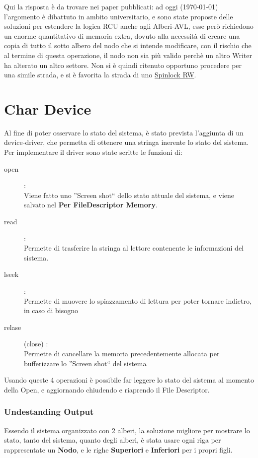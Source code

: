 Qui la risposta è da trovare nei paper pubblicati: ad oggi (\today) l'argomento è dibattuto in ambito universitario, e
sono state proposte delle soluzioni per estendere la logica RCU anche agli Alberi-AVL, esse però richiedono un enorme
quantitativo di memoria extra, dovuto alla necessità di creare una copia di tutto il sotto albero del nodo che si
intende modificare, con il rischio che al termine di questa operazione, il nodo non sia più valido perchè un altro
Writer ha alterato un altro settore. Non si è quindi ritenuto opportuno procedere per una simile strada, e si è
favorita la strada di uno \underline{Spinlock RW}.

\newpage

\section{Char Device} \label{CharDevice}

Al fine di poter osservare lo stato del sistema, è stato prevista l'aggiunta di un device-driver, che permetta di
ottenere una stringa inerente lo stato del sistema.
Per implementare il driver sono state scritte le funzioni di:
\begin{description}
 \item[open] :\\
 Viene fatto uno ''Screen shot`` dello stato attuale del sistema, e viene salvato nel \textbf{Per FileDescriptor
Memory}.
 \item[read] :\\
 Permette di trasferire la stringa al lettore contenente le informazioni del sistema.
 \item[lseek] :\\
 Permette di muovere lo spiazzamento di lettura per poter tornare indietro, in caso di bisogno
 \item[relase] (close) :\\
 Permette di cancellare la memoria precedentemente allocata per bufferizzare lo ''Screen shot`` del sistema
\end{description}


Usando queste 4 operazioni è possibile far leggere lo stato del sistema al momento della Open, e aggiornando chiudendo
e riaprendo il File Descriptor.

\subsubsection{Undestanding Output}

Essendo il sistema organizzato con 2 alberi, la soluzione migliore per mostrare lo stato, tanto del sistema, quanto
degli alberi, è stata usare ogni riga per rappresentate un \textbf{Nodo}, e le righe \textbf{Superiori} e
\textbf{Inferiori} per i propri figli.

